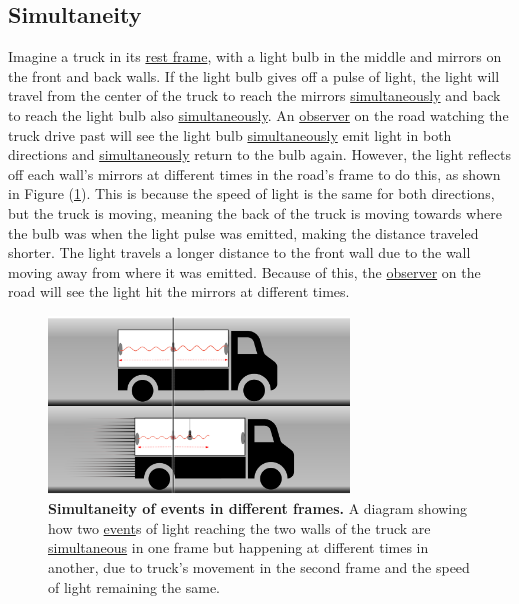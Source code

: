 \subsection{Simultaneity} \label{subsect: Simultaneity}

Imagine a truck in its \hyperlink{def-proper-frame}{rest frame}, with a light bulb in the middle and mirrors on the front and back walls.
If the light bulb gives off a pulse of light, the light will travel from the center of the truck to reach the mirrors \hyperlink{def-simultaneity}{simultaneously} and back to reach the light bulb also \hyperlink{def-simultaneity}{simultaneously}.
An \hyperlink{def-observer}{observer} on the road watching the truck drive past will see the light bulb \hyperlink{def-simultaneity}{simultaneously} emit light in both directions and \hyperlink{def-simultaneity}{simultaneously} return to the bulb again.
However, the light reflects off each wall's mirrors at different times in the road's frame to do this, as shown in Figure (\ref{fig: truck simultaneity}).
This is because the speed of light is the same for both directions, but the truck is moving, meaning the back of the truck is moving towards where the bulb was when the light pulse was emitted, making the distance traveled shorter.
The light travels a longer distance to the front wall due to the wall moving away from where it was emitted.
Because of this, the \hyperlink{def-observer}{observer} on the road will see the light hit the mirrors at different times.

\begin{figure}[htbp]
	\centering
	\includegraphics[width = 8cm]{images/pdf/lorry_simul.pdf}
	\caption{\textbf{Simultaneity of events in different frames.} A diagram showing how two \protect\hyperlink{def-event}{event}s of light reaching the two walls of the truck are \protect\hyperlink{def-simultaneity}{simultaneous} in one frame but happening at different times in another, due to truck's movement in the second frame and the speed of light remaining the same.}
	\label{fig: truck simultaneity}
\end{figure}


